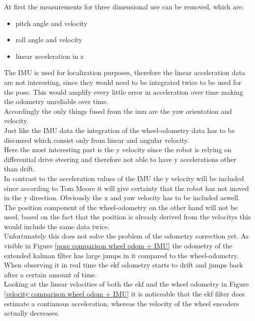 At first the measurements for three dimensional use can be removed, which are:
\begin{itemize}
	\item pitch angle and velocity
	\item roll angle and velocity
	\item linear acceleration in z
\end{itemize}

The IMU is used for localization purposes, therefore the linear acceleration data are not interesting, since they would need to be integrated twice to be used for the pose. This would amplify every little error in acceleration over time making the odometry unreliable over time.\\

Accordingly the only things fused from the imu are the yaw orientation and velocity.\\

Just like the IMU data the integration of the wheel-odometry data has to be discussed which consist only from linear and angular velocity.\\
Here the most interesting part is the y velocity since the robot is relying on differential drive steering and therefore not able to have y accelerations other than drift.\\

In contrast to the acceleration values of the IMU the y velocity will be included since according to Tom Moore \cite{robotlocalizationconfiguration} it will give certainty that the robot has not moved in the y direction. Obviously the x and yaw velocity has to be included aswell.
The position component of the wheel-odometry on the other hand will not be used, based on the fact that the position is already derived from the velocitys this would include the same data twice.\\

Unfortunately this does not solve the problem of the odometry correction yet. As visible in Figure \ref{pose comparison wheel odom + IMU} the odometry of the extended kalman filter has large jumps in it compared to the wheel-odometry. When observing it in real time the ekf odometry starts to drift and jumps back after a certain amount of time.\\
Looking at the linear velocities of both the ekf and the wheel odometry in Figure \ref{velocity comparison wheel odom + IMU} it is noticeable that the ekf filter does estimate a continuous acceleration, whereas the velocity of the wheel encoders actually decreases.\\



